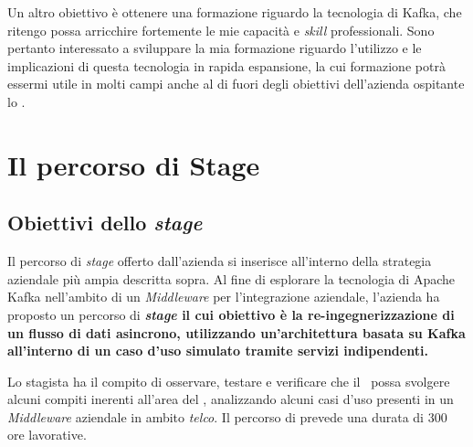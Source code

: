 Un altro obiettivo è ottenere una formazione riguardo la tecnologia di Kafka, che ritengo possa arricchire fortemente le mie capacità e \textit{skill} professionali.
Sono pertanto interessato a sviluppare la mia formazione riguardo l'utilizzo e le implicazioni di questa tecnologia in rapida espansione, la cui formazione potrà essermi utile in molti campi anche al di fuori degli obiettivi dell'azienda ospitante lo \stage.


\section{Il percorso di Stage}


%
%

\subsection{Obiettivi dello \textit{stage}}

Il percorso di \textit{stage} offerto dall'azienda si inserisce all'interno della strategia aziendale più ampia descritta sopra.
Al fine di esplorare la tecnologia di Apache Kafka nell'ambito di un \textit{Middleware} per l'integrazione aziendale, l'azienda ha proposto un percorso di \textbf{\textit{stage} il cui obiettivo è la re-ingegnerizzazione di un flusso di dati asincrono, utilizzando un'architettura basata su Kafka all'interno di un caso d'uso simulato tramite servizi indipendenti.}

Lo stagista ha il compito di osservare, testare e verificare che il \software\ possa svolgere alcuni compiti inerenti all'area del , analizzando alcuni casi d'uso presenti in un \textit{Middleware} aziendale in ambito \textit{telco}.
Il percorso di prevede una durata di 300 ore lavorative.

